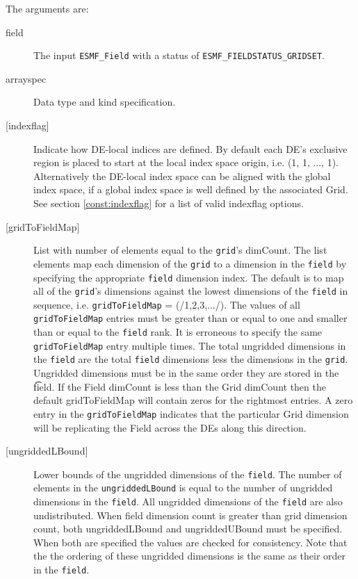    The arguments are:
   \begin{description}
   \item[field]
   The input {\tt ESMF\_Field} with a status of
   {\tt ESMF\_FIELDSTATUS\_GRIDSET}.
   \item[arrayspec]
   Data type and kind specification.
   \item[{[indexflag]}]
   Indicate how DE-local indices are defined. By default each DE's
   exclusive region is placed to start at the local index space origin,
   i.e. (1, 1, ..., 1). Alternatively the DE-local index space can be
   aligned with the global index space, if a global index space is well
   defined by the associated Grid. See section \ref{const:indexflag}
   for a list of valid indexflag options.
   \item [{[gridToFieldMap]}]
   List with number of elements equal to the
   {\tt grid}'s dimCount. The list elements map each dimension
   of the {\tt grid} to a dimension in the {\tt field} by
   specifying the appropriate {\tt field} dimension index. The default is to
   map all of the {\tt grid}'s dimensions against the lowest dimensions of
   the {\tt field} in sequence, i.e. {\tt gridToFieldMap} = (/1,2,3,.../).
   The values of all {\tt gridToFieldMap} entries must be greater than or equal
   to one and smaller than or equal to the {\tt field} rank.
   It is erroneous to specify the same {\tt gridToFieldMap} entry
   multiple times. The total ungridded dimensions in the {\tt field}
   are the total {\tt field} dimensions less
   the dimensions in
   the {\tt grid}. Ungridded dimensions must be in the same order they are
   stored in the {\t field}.
   If the Field dimCount is less than the Grid dimCount then the default
   gridToFieldMap will contain zeros for the rightmost entries. A zero
   entry in the {\tt gridToFieldMap} indicates that the particular
   Grid dimension will be replicating the Field across the DEs along
   this direction.
   \item [{[ungriddedLBound]}]
   Lower bounds of the ungridded dimensions of the {\tt field}.
   The number of elements in the {\tt ungriddedLBound} is equal to the number of ungridded
   dimensions in the {\tt field}. All ungridded dimensions of the
   {\tt field} are also undistributed. When field dimension count is
   greater than grid dimension count, both ungriddedLBound and ungriddedUBound
   must be specified. When both are specified the values are checked
   for consistency. Note that the the ordering of
   these ungridded dimensions is the same as their order in the {\tt field}.

\end{description}
